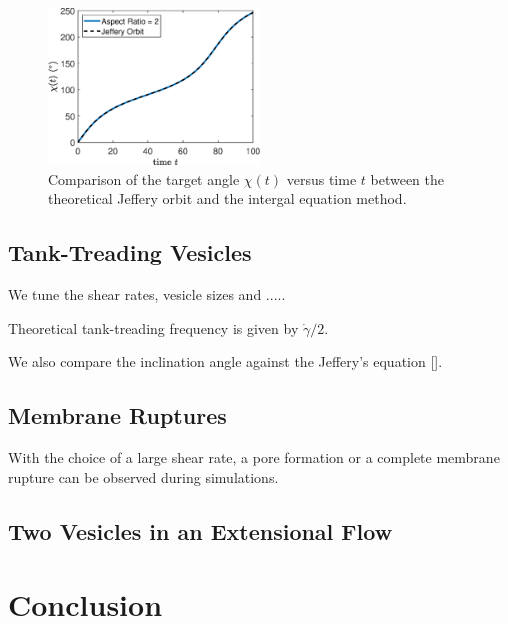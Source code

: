 \documentclass[lineno]{jfm}
\begin{document}
\begin{figure}[h]
\begin{center}
\includegraphics[width=0.5\textwidth]{JefferyOrbit.eps}
\end{center}
  \caption{Comparison of the target angle $\chi(t)$ versus time $t$ between the theoretical Jeffery orbit and the intergal equation method.
  }
    \label{figure1}
\end{figure}



\subsection{Tank-Treading Vesicles}

We tune the shear rates, vesicle sizes and .....


Theoretical tank-treading frequency is given by $\dot\gamma/2$.


We also compare the inclination angle against the Jeffery's equation [].

\subsection{Membrane Ruptures}

With the choice of a large shear rate, a pore formation or a complete membrane rupture can be observed during simulations. 



\subsection{Two Vesicles in an Extensional Flow}



\section{\label{conclusion}Conclusion}


\begin{acknowledgments}
\end{acknowledgments}
\end{document}
